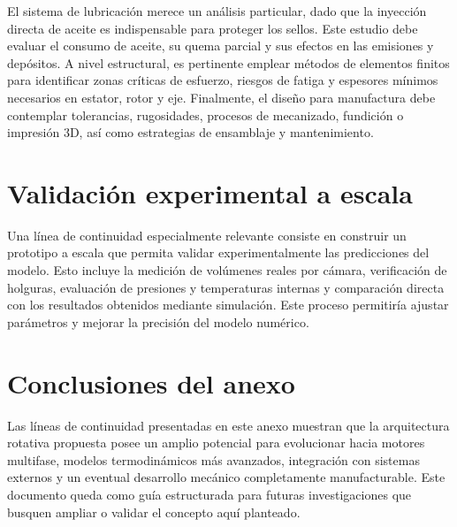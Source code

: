\documentclass[a4paper,12pt]{article}
\begin{document}
El sistema de lubricación merece un análisis particular, dado que la inyección directa de aceite es indispensable para proteger los sellos. Este estudio debe evaluar el consumo de aceite, su quema parcial y sus efectos en las emisiones y depósitos. A nivel estructural, es pertinente emplear métodos de elementos finitos para identificar zonas críticas de esfuerzo, riesgos de fatiga y espesores mínimos necesarios en estator, rotor y eje. Finalmente, el diseño para manufactura debe contemplar tolerancias, rugosidades, procesos de mecanizado, fundición o impresión 3D, así como estrategias de ensamblaje y mantenimiento.

\section{Validación experimental a escala}

Una línea de continuidad especialmente relevante consiste en construir un prototipo a escala que permita validar experimentalmente las predicciones del modelo. Esto incluye la medición de volúmenes reales por cámara, verificación de holguras, evaluación de presiones y temperaturas internas y comparación directa con los resultados obtenidos mediante simulación. Este proceso permitiría ajustar parámetros y mejorar la precisión del modelo numérico.

\section{Conclusiones del anexo}

Las líneas de continuidad presentadas en este anexo muestran que la arquitectura rotativa propuesta posee un amplio potencial para evolucionar hacia motores multifase, modelos termodinámicos más avanzados, integración con sistemas externos y un eventual desarrollo mecánico completamente manufacturable. Este documento queda como guía estructurada para futuras investigaciones que busquen ampliar o validar el concepto aquí planteado.

\printbibliography
\end{document}
